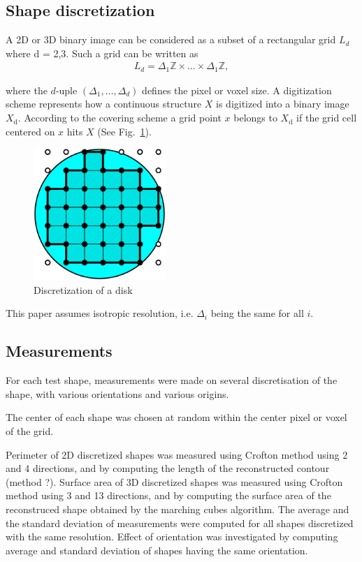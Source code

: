 \documentclass{InsightArticle}
\begin{document}
\subsection{Shape discretization}

A 2D or 3D binary image can be considered as a subset of a rectangular grid $L_d$ where
d = 2,3. Such a grid can be written as
\begin{eqnarray}
L_d = \Delta_{1} \mathbb{Z} \times \ldots \times \Delta_{1} \mathbb{Z},
\end{eqnarray}

where the $d$-uple $(\Delta_{1},\ldots,\Delta_{d})$ defines the pixel
or voxel size. A digitization scheme represents how a continuous
structure $X$ is digitized into a binary image $X_\text{d}$. 
According to the
covering scheme a grid point $x$ belongs to $X_\text{d}$ if the grid
cell centered on $x$ hits $X$ (See Fig.~\ref{fig:DiskDiscretization}).

\begin{figure}[!htb]
\begin{center}
\includegraphics[width=5cm]{images/discreteDisk}
\end{center}
\caption{Discretization of a disk}
\label{fig:DiskDiscretization}
\end{figure}
This paper assumes isotropic resolution, i.e. $\Delta_{i}$ being the same for all $i$.


\subsection{Measurements}

For each test shape, measurements were made on
several discretisation of the shape, with various orientations and various origins.

The center of each shape was chosen at random within the center pixel or voxel of the grid.

Perimeter of 2D discretized shapes was measured using Crofton method using 2 and 4 directions, 
and by computing the length of the reconstructed contour (method ?).
Surface area of 3D discretized shapes was measured using Crofton method using 3 and 13 directions, 
and by computing the surface area of the reconstruced shape obtained by the marching cubes algorithm.
The average and the standard deviation of measurements were computed for all shapes discretized
with the same resolution. Effect of orientation was investigated by computing average and standard 
deviation of shapes having the same orientation.
\end{document}
